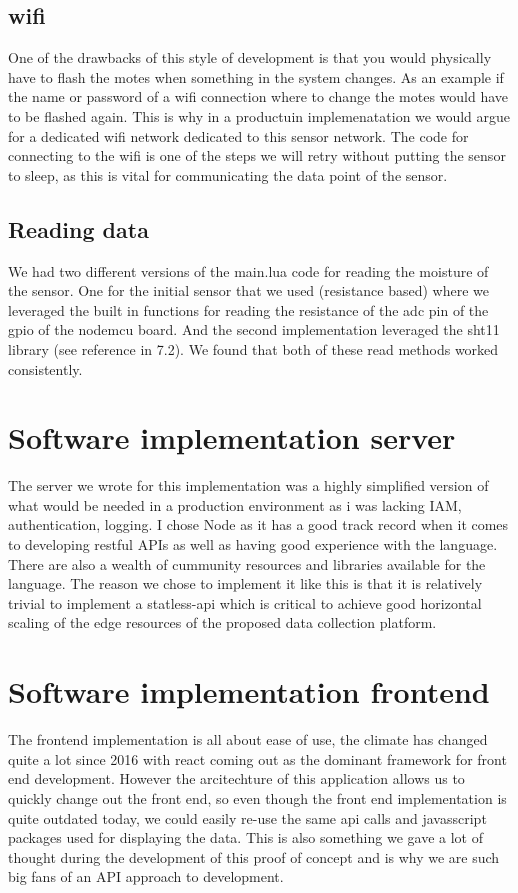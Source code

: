 \documentclass[]{uiophd}
\begin{document}
\subsection{wifi}
One of the drawbacks of this style of development is that you would physically have to flash the motes when something in the system changes. As an example if the name or password of a wifi connection where to change the motes would have to be flashed again. This is why in a productuin implemenatation we would argue for a dedicated wifi network dedicated to this sensor network. The code for connecting to the wifi is one of the steps we will retry without putting the sensor to sleep, as this is vital for communicating the data point of the sensor.
\subsection{Reading data}
We had two different versions of the main.lua code for reading the moisture of the sensor. One for the initial sensor that we used (resistance based) where we leveraged the built in functions for reading the resistance of the adc pin of the gpio of the nodemcu board. And the second implementation leveraged the sht11 library (see reference in 7.2). We found that both of these read methods worked consistently.
\section{Software implementation server}
The server we wrote for this implementation was a highly simplified version of what would be needed in a production environment as i was lacking IAM, authentication, logging. I chose Node as it has a good track record when it comes to developing restful APIs as well as having good experience with the language. There are also a wealth of cummunity resources and libraries available for the language. The reason we chose to implement it like this is that it is relatively trivial to implement a statless-api which is critical to achieve good horizontal scaling of the edge resources of the proposed data collection platform.
\section{Software implementation frontend}
The frontend implementation is all about ease of use, the climate has changed quite a lot since 2016 with react coming out as the dominant framework for front end development. However the arcitechture of this application allows us to quickly change out the front end, so even though the front end implementation is quite outdated today, we could easily re-use the same api calls and javasscript packages used for displaying the data. This is also something we gave a lot of thought during the development of this proof of concept and is why we are such big fans of an API approach to development. 
\end{document}
